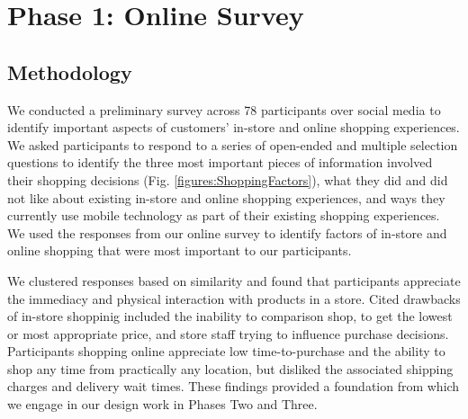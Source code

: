 \section{Phase 1: Online Survey}

 \subsection{Methodology}
We conducted a preliminary survey across 78 participants over social media to identify important aspects of customers' in-store and online shopping experiences. We asked participants to respond to a series of open-ended and multiple selection questions to identify the three most important pieces of information involved their shopping decisions (Fig. \ref{figures:ShoppingFactors}), what they did and did not like about existing in-store and online shopping experiences, and ways they currently use mobile technology as part of their existing shopping experiences.
We used the responses from our online survey to
identify 
factors of in-store and online shopping that were most important to our participants. 

We clustered responses based on similarity and found that participants appreciate the immediacy and physical interaction with products in a store. Cited drawbacks of in-store shoppinig included the inability to comparison shop, to get the lowest or most appropriate price, and store staff trying to influence purchase decisions.  Participants shopping online appreciate low time-to-purchase and the ability to shop any time from practically any location, but disliked the associated shipping charges and delivery wait times. These findings provided a foundation from which we engage in our design work in Phases Two and Three. 
